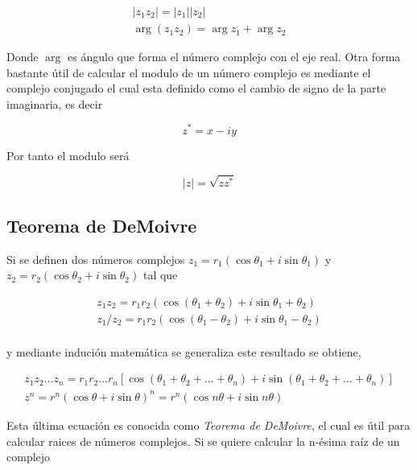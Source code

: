         \begin{gather*}
            |z_1 z_2 | = |z_1||z_2|\\
            \arg(z_1z_2) = \arg z_1 + \arg z_2
        \end{gather*}

        Donde $\arg$ es ángulo que forma el número complejo con el eje real. Otra forma bastante útil de calcular el modulo de un número complejo es mediante el complejo conjugado el cual esta definido como el cambio de signo de la parte imaginaria, es decir 

        \begin{equation*}
            z^{*} = x - iy 
        \end{equation*}

        Por tanto el modulo será 

        \begin{equation*}
            |z| = \sqrt{zz^{*}}
        \end{equation*}

    \subsection{Teorema de DeMoivre}

        Si se definen dos números complejos $z_1 = r_1(\cos\theta_1 + i\sin\theta_1)$ y $z_2 = r_2(\cos\theta_2 + i\sin\theta_2)$ tal que 

        \begin{gather*}
            z_1z_2 = r_1r_2(\cos(\theta_1 + \theta_2)+ i\sin{\theta_1 + \theta_2})\\
            z_1/z_2 = r_1r_2(\cos(\theta_1 - \theta_2)+ i\sin{\theta_1 - \theta_2})\\
        \end{gather*}

        y mediante indución matemática se generaliza este resultado se obtiene,

        \begin{gather*}
            z_1z_2\dots z_n = r_1r_2\dots r_n\left[\cos(\theta_1 + \theta_2 + \dots + \theta_n) + i\sin(\theta_1 + \theta_2 + \dots + \theta_n)\right]\\
            z^{n} = r^{n}\left(\cos\theta + i\sin\theta\right)^{n} = r^{n}(\cos{n\theta}+ i\sin{n\theta})
        \end{gather*}

        Esta última ecuación es conocida como \textit{Teorema de DeMoivre}, el cual es útil para calcular raices de números complejos. Si se quiere calcular la n-ésima raíz de un complejo

